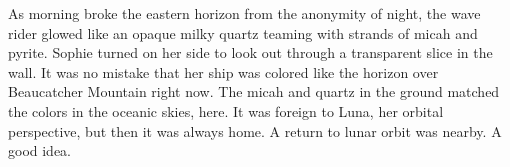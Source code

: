 

As morning broke the eastern horizon from the anonymity of night, the
wave rider glowed like an opaque milky quartz teaming with strands of
micah and pyrite.  Sophie turned on her side to look out through a
transparent slice in the wall.  It was no mistake that her ship was
colored like the horizon over Beaucatcher Mountain right now.  The
micah and quartz in the ground matched the colors in the oceanic
skies, here.  It was foreign to Luna, her orbital perspective, but
then it was always home.  A return to lunar orbit was nearby.  A good
idea.

\bye

